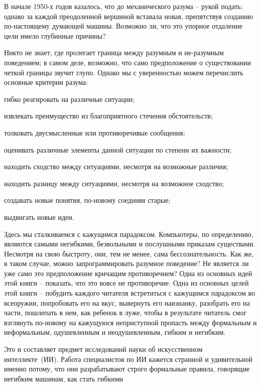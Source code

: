 \documentclass[../main.tex]{subfiles}
\begin{document}
В начале 1950-х годов казалось, что до механического разума \--- рукой подать: однако за каждой преодоленной вершиной вставала новая, препятствуя созданию по-настоящему думающей машины. Возможно ли, что это упорное отдаление цели имело глубинные причины?

Никто не знает, где пролегает граница между разумным и не-разумным поведением; в самом деле, возможно, что само предположение о существовании четкой границы звучит глупо. Однако мы с уверенностью можем перечислить основные критерии разума:

гибко реагировать на различные ситуации;

извлекать преимущество из благоприятного стечения обстоятельств;

толковать двусмысленные или противоречивые сообщения;

оценивать различные элементы данной ситуации по степени их важности;

находить сходство между ситуациями, несмотря на возможные различия;

находить разницу между ситуациями, несмотря на возможное сходство;

создавать новые понятия, по-новому соединяя старые;

выдвигать новые идеи.

Здесь мы сталкиваемся с кажущимся парадоксом. Компьютеры, по определению, являются самыми негибкими, безвольными и послушными приказам существами. Несмотря на свою быстроту, они, тем не менее, сама бессознательность. Как же, в таком случае, можно запрограммировать разумное поведение? Не является ли уже само это предположение кричащим противоречием? Одна из основных идей этой книги \--- показать, что это вовсе не противоречие. Одна из основных целей этой книги \--- побудить каждого читателя встретиться с кажущимся парадоксом во всеоружии, попробовать его на вкус, вывернуть его наизнанку, разобрать его на части, пошлепать в нем, как ребенок в луже, чтобы в результате читатель смог взглянуть по-новому на кажущуюся неприступной пропасть между формальным и неформальным, одушевленным и неодушевленным, гибким и негибким.

Это и составляет предмет исследований науки об искусственном интеллекте~(ИИ). Работа специалистов по ИИ кажется странной и удивительной именно потому, что они разрабатывают строго формальные правила, говорящие негибким машинам, как стать гибкими
\end{document}

